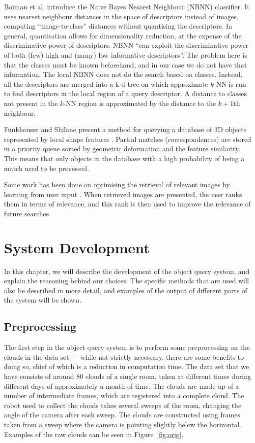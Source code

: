 \documentclass[11pt,a4paper]{kth-mag}
\begin{document}
Boiman et al. \cite{boiman2008defense} introduce the Naive Bayes Nearest
Neighbour (NBNN) classifier. It uses nearest neighbour distances in the space of
descriptors instead of images, computing ``image-to-class'' distances without
quantising the descriptors. In general, quantisation allows for dimensionality
reduction, at the expense of the discriminative power of descriptors. NBNN ``can
exploit the discriminative power of both (few) high and (many) low informative
descriptors''. The problem here is that the classes must be known beforehand,
and in our case we do not have that information. The local NBNN
\cite{mccann2012local} does not do the search based on classes. Instead, all the
descriptors are merged into a k-d tree on which approximate $k$-NN is run to
find descriptors in the local region of a query descriptor. A distance to
classes not present in the $k$-NN region is approximated by the distance to the
$k+1$th neighbour.

Funkhouser and Shilane present a method for querying a database of 3D objects
represented by local shape features \cite{funkhouser2006partial}. Partial
matches (correspondences) are stored in a priority queue sorted by geometric
deformation and the feature similarity. This means that only objects in the
database with a high probability of being a match need to be processed.

Some work has been done on optimising the retrieval of relevant images by
learning from user input \cite{rui2000optimizing}. When retrieved images are
presented, the user ranks them in terms of relevance, and this rank is then used
to improve the relevance of future searches.

\chapter{System Development}
\label{chap:devel}
In this chapter, we will describe the development of the object query system,
and explain the reasoning behind our choices. The specific methods that are used
will also be described in more detail, and examples of the output of different
parts of the system will be shown.

\section{Preprocessing}
The first step in the object query system is to perform some preprocessing on
the clouds in the data set --- while not strictly necessary, there are some
benefits to doing so, chief of which is a reduction in computation time. The
data set that we have consists of around 80 clouds of a single room, taken at
different times during different days of approximately a month of time. The
clouds are made up of a number of intermediate frames, which are registered into
a complete cloud. The robot used to collect the clouds takes several sweeps of
the room, changing the angle of the camera after each sweep. The clouds are
constructed using frames taken from a sweep where the camera is pointing
slightly below the horizontal. Examples of the raw clouds can be seen in
Figure~\ref{fig:orig}.
\end{document}
